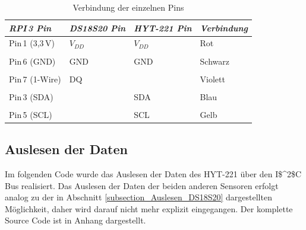 \begin{table}[H]
\centering
\begin{tabular}{
llll
}
\toprule

\multicolumn{1}{p{3cm}}{\textit{\ac{RPI}\,3 Pin}} & \multicolumn{1}{p{3cm}}{\textit{DS18S20 Pin} }&\multicolumn{1}{p{3cm}}{\textit{HYT-221 Pin}}&\multicolumn{1}{p{3cm}}{\textit{Verbindung}}\\\midrule
Pin\,1 (3,3\,V) & $V_{DD}$&$V_{DD}$ & Rot\\
&&&\\
Pin\,6 (GND) & GND&GND & Schwarz\\
&&&\\
Pin\,7 (1-Wire) & DQ& & Violett\\
&&&\\
Pin\,3 (SDA) & & SDA&Blau\\
&&&\\
Pin\,5 (SCL)&& SCL& Gelb\\ 
\bottomrule
\end{tabular}
\caption{Verbindung der einzelnen Pins}
\label{Tabelle_Elektrische_Daten_DS18S20}
\end{table}

\subsection{Auslesen der Daten}
\label{subsection_Auslesen der Daten HYT221}
Im folgenden Code wurde das Auslesen der Daten des HYT-221 über den \ac{I$^2$C} Bus realisiert. Das Auslesen der Daten der beiden anderen Sensoren erfolgt analog zu der in Abschnitt \ref{subsection_Auslesen_DS18S20} dargestellten Möglichkeit, daher wird darauf nicht mehr explizit eingegangen. Der komplette Source Code ist in Anhang dargestellt.



